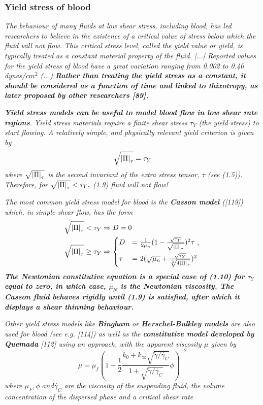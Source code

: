 \documentclass[11pt,letterpaper]{article}
\begin{document}
\subsubsection*{Yield stress of blood} \textit{The behaviour of many fluids at low shear stress, including blood, has led researchers to believe in the existence of a critical value of stress below which the fluid will not flow. This critical stress level, called the yield value or yield, is typically treated as a constant material property of the fluid. [...] Reported values for the yield stress of blood have a great variation ranging from 0.002 to 0.40 dynes/c$m^2$ (...) \textbf{Rather than treating the yield stress as a constant, it should be considered as a function of time and linked to thixotropy, as later proposed by other researchers [89].}}

\textit{{\color{blue}\textbf{Yield stress models can be useful to model blood flow in low shear rate regions}}. Yield stress materials
require a finite shear stress $\tau_Y$ (the yield stress) to start flowing. A relatively simple, and physically relevant yield criterion is given by \begin{equation}
    \sqrt{\abs{\Pi}_{\tau}} = \tau_Y
\end{equation}
where $\sqrt{\abs{\Pi}_{\tau}}$ is the second invariant of the extra stress tensor, $\tau$  (see (1.5)). Therefore, for $ \sqrt{\abs{\Pi}_{\tau}} < \tau_Y,$ (1.9)
fluid will not flow!}


\textit{The most common yield stress model for blood is the {\color{red}\textbf{Casson model}} ([119]) which, in simple shear flow,
has the form\begin{align}
    \sqrt{\abs{\Pi}_{\tau}} < \tau_Y &\Rightarrow D=0 \\
    \sqrt{\abs{\Pi}_{\tau}} \geq \tau_Y &\Rightarrow  \begin{dcases*}
        D &= $\frac{1}{2\mu_n}(1- \frac{\sqrt{\tau_Y}}{ \sqrt{\abs{\Pi}_{\tau}}})^2\tau$ ,\\
        \tau &= $2(\sqrt{\mu_n}+\frac{\sqrt{\tau_Y}}{ \sqrt[4]{4\abs{\Pi}_{\tau}}})^2$
        \end{dcases*}
\end{align} \textbf{The Newtonian constitutive equation is a special case of (1.10) for $\tau_Y$ equal to zero, in which case, $\mu_N$ is the Newtonian viscosity. The Casson fluid behaves rigidly until (1.9) is satisfied, after which it displays a shear thinning behaviour.}} 


\textit{Other yield stress models like {\color{red}\textbf{Bingham}} or {\color{red}\textbf{Herschel-Bulkley models}} are also used for blood (see e.g.
[114]) as well as the {\color{red}\textbf{constitutive model developed by Quemada}} [112] using an approach, with the apparent viscosity $\mu$ given by
\begin{equation}
    \mu = \mu_f (1 -\frac{1}{2}\frac{k_0+k_{\infty}\sqrt{\Dot{\gamma}/\Dot{\gamma_C}}}{1+\sqrt{\Dot{\gamma}/\Dot{\gamma_C}}}\phi)^{-2}
\end{equation}
where $\mu_F, \phi \hspace{4pt }and \Dot{\gamma_C}$ are the viscosity of the suspending fluid, the volume concentration of the dispersed phase and a critical shear rate
}
\end{document}
